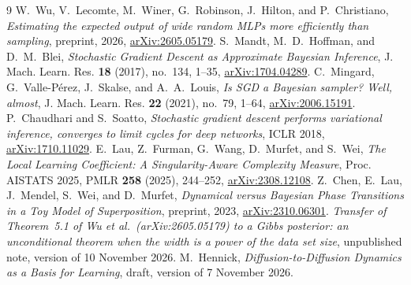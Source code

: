 \documentclass[11pt]{article}
\theoremstyle{remark}
\begin{document}
\begin{thebibliography}{9}
W.~Wu, V.~Lecomte, M.~Winer, G.~Robinson, J.~Hilton, and P.~Christiano,
\newblock \emph{Estimating the expected output of wide random {MLPs} more efficiently than sampling},
\newblock preprint, 2026, \href{https://arxiv.org/abs/2605.05179}{arXiv:2605.05179}.
S.~Mandt, M.~D.~Hoffman, and D.~M.~Blei,
\newblock \emph{Stochastic Gradient Descent as Approximate {B}ayesian Inference},
\newblock J. Mach. Learn. Res. \textbf{18} (2017), no.~134, 1--35, \href{https://arxiv.org/abs/1704.04289}{arXiv:1704.04289}.
C.~Mingard, G.~Valle-P\'erez, J.~Skalse, and A.~A.~Louis,
\newblock \emph{Is {SGD} a {B}ayesian sampler? {W}ell, almost},
\newblock J. Mach. Learn. Res. \textbf{22} (2021), no.~79, 1--64, \href{https://arxiv.org/abs/2006.15191}{arXiv:2006.15191}.
P.~Chaudhari and S.~Soatto,
\newblock \emph{Stochastic gradient descent performs variational inference, converges to limit cycles for deep networks},
\newblock ICLR 2018, \href{https://arxiv.org/abs/1710.11029}{arXiv:1710.11029}.
E.~Lau, Z.~Furman, G.~Wang, D.~Murfet, and S.~Wei,
\newblock \emph{The Local Learning Coefficient: A Singularity-Aware Complexity Measure},
\newblock Proc. AISTATS 2025, PMLR \textbf{258} (2025), 244--252, \href{https://arxiv.org/abs/2308.12108}{arXiv:2308.12108}.
Z.~Chen, E.~Lau, J.~Mendel, S.~Wei, and D.~Murfet,
\newblock \emph{Dynamical versus {B}ayesian Phase Transitions in a Toy Model of Superposition},
\newblock preprint, 2023, \href{https://arxiv.org/abs/2310.06301}{arXiv:2310.06301}.
\emph{Transfer of Theorem~5.1 of Wu et al.\ (arXiv:2605.05179) to a Gibbs posterior: an unconditional theorem when the width is a power of the data set size},
\newblock unpublished note, version of 10 November 2026.
M.~Hennick,
\newblock \emph{Diffusion-to-Diffusion Dynamics as a Basis for Learning},
\newblock draft, version of 7 November 2026.
\end{thebibliography}
\end{document}
